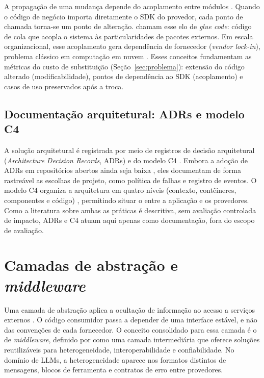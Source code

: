 A propagação de uma mudança depende do acoplamento entre módulos
\cite{stevens1974}. Quando o código de negócio importa diretamente o SDK do
provedor, cada ponto de chamada torna-se um ponto de alteração.
 chamam esse elo de \textit{glue code}: código de cola
que acopla o sistema às particularidades de pacotes externos. Em escala
organizacional, esse acoplamento gera dependência de fornecedor
(\textit{vendor lock-in}), problema clássico em computação em nuvem
\cite{kaur2017}. Esses conceitos fundamentam as métricas do custo de
substituição (Seção~\ref{sec:problema}): extensão do código alterado
(modificabilidade), pontos de dependência ao SDK (acoplamento) e casos de uso
preservados após a troca.

\subsection{Documentação arquitetural: ADRs e modelo C4}
\label{subsec:arq-documentacao}

A solução arquitetural é registrada por meio de registros de decisão
arquitetural (\textit{Architecture Decision Records}, ADRs)
\cite{tyree2005} e do modelo C4 \cite{brown-c4}. Embora a adoção de ADRs em
repositórios abertos ainda seja baixa \cite{buchgeher2023}, eles documentam de
forma rastreável as escolhas de projeto, como política de falhas e registro de
eventos. O modelo C4 organiza a arquitetura em quatro níveis (contexto,
contêineres, componentes e código) \cite{mavrogiorgou2025}, permitindo situar o
\harness{} entre a aplicação e os provedores. Como a literatura sobre ambas as
práticas é descritiva, sem avaliação controlada de impacto, ADRs e C4 atuam
aqui apenas como documentação, fora do escopo de avaliação.

\section{Camadas de abstração e \textit{middleware}}
\label{sec:abstracao}

Uma camada de abstração aplica a ocultação de informação ao acesso a serviços
externos \cite{parnas1972}. O código consumidor passa a depender de uma
interface estável, e não das convenções de cada fornecedor. O conceito
consolidado para essa camada é o de \textit{middleware}, definido por
 como uma camada intermediária que oferece soluções
reutilizáveis para heterogeneidade, interoperabilidade e confiabilidade. No
domínio de LLMs, a heterogeneidade aparece nos formatos distintos de mensagens,
blocos de ferramenta e contratos de erro entre provedores.

